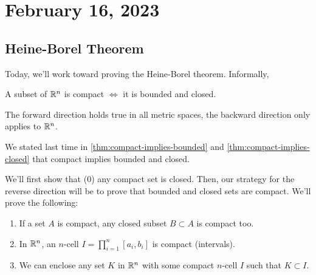 \section{February 16, 2023}
\subsection{Heine-Borel Theorem}
Today, we'll work toward proving the Heine-Borel theorem. Informally,
\begin{theorem*}
    A subset of $\mathbb R^n$ is compact $\iff$ it is bounded and closed.
\end{theorem*}

The forward direction holds true in all metric spaces, the backward direction only applies to $\mathbb R^n$.

We stated last time in \cref{thm:compact-implies-bounded} and \cref{thm:compact-implies-closed} that compact implies bounded and closed.

We'll first show that (0) any compact set is closed. Then, our strategy for the reverse direction will be to prove that bounded and closed sets are compact. We'll prove the following:
\begin{enumerate}[(1)]
    \item If a set $A$ is compact, any closed subset $B\subset A$ is compact too.
    \item In $\mathbb R^n$, an $n$-cell $\displaystyle I = \prod_{i=1}^n[a_i, b_i]$ is compact (intervals).
    \item We can enclose any set $K$ in $\mathbb R^n$ with some compact $n$-cell $I$ such that $K\subset I$.
\end{enumerate}

